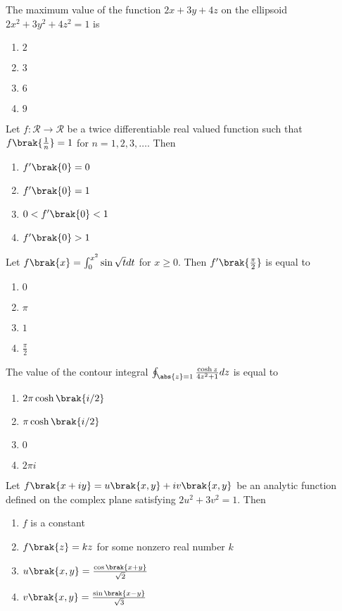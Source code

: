     \item The maximum value of the function $2x +3y +4z$ on the ellipsoid $2x^2 +3y^2+ 4z^2 = 1$ is
        \begin{enumerate}
            \item $2$
            \item $3$
            \item $6$
            \item $9$
        \end{enumerate}

    \item Let $f : \mathcal{R} \to \mathcal{R}$ be a twice differentiable real valued function such that $f\brak{\frac{1}{n}} = 1$ for $n = 1,2,3,\ldots$. Then
        \begin{enumerate}
            \item $f^{\prime}\brak{0} = 0$
            \item $f^{\prime}\brak{0} = 1$
            \item $0 < f^{\prime}\brak{0} < 1$
            \item $f^{\prime}\brak{0} > 1$
        \end{enumerate}

    \item Let $f\brak{x} = \int_{0}^{x^2} \sin \sqrt{t} dt$ for $x\geq0$. Then $f^{\prime}\brak{\frac{\pi}{2}}$ is equal to
        \begin{enumerate}
            \item $0$
            \item $\pi$
            \item $1$
            \item $\frac{\pi}{2}$
        \end{enumerate}

    \item The value of the contour integral $\oint_{\abs{z}=1} \frac{\cosh z}{4z^2+1} dz$ is equal to
        \begin{enumerate}
            \item $2 \pi \cosh \brak{i/2}$
            \item $\pi \cosh \brak{i/2}$
            \item $0$
            \item $2 \pi i$
        \end{enumerate}

    \item Let $f\brak{x + iy} = u\brak{x,y} + iv\brak{x,y}$ be an analytic function defined on the complex plane satisfying $2u^2 + 3v^2=1$. Then
        \begin{enumerate}
            \item $f$ is a constant
            \item $f\brak{z} = kz$ for some nonzero real number $k$
            \item $u\brak{x,y} = \frac{\cos \brak{x+y}}{\sqrt{2}}$
            \item $v\brak{x,y} = \frac{\sin \brak{x-y}}{\sqrt{3}}$
        \end{enumerate}

